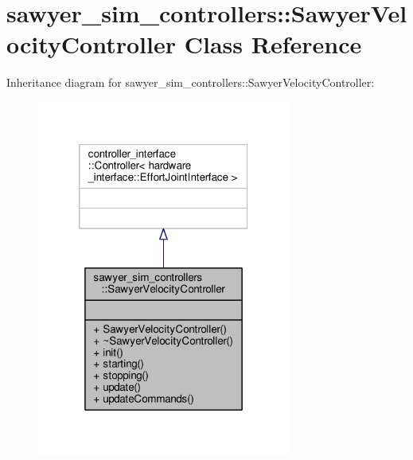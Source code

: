 \hypertarget{classsawyer__sim__controllers_1_1_sawyer_velocity_controller}{\section{sawyer\-\_\-sim\-\_\-controllers\-:\-:Sawyer\-Velocity\-Controller Class Reference}
\label{classsawyer__sim__controllers_1_1_sawyer_velocity_controller}
}


Inheritance diagram for sawyer\-\_\-sim\-\_\-controllers\-:\-:Sawyer\-Velocity\-Controller\-:\nopagebreak
\begin{figure}[H]
\begin{center}
\leavevmode
\includegraphics[width=236pt]{classsawyer__sim__controllers_1_1_sawyer_velocity_controller__inherit__graph}
\end{center}
\end{figure}


